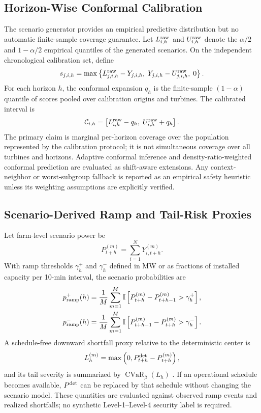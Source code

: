 \documentclass[journal]{IEEEtran}
\newcommand{\1}{\mathbb{I}}
\begin{document}
\subsection{Horizon-Wise Conformal Calibration}
The scenario generator provides an empirical predictive distribution but no automatic finite-sample coverage guarantee. Let $L^{\rm raw}_{i,h}$ and $U^{\rm raw}_{i,h}$ denote the $\alpha/2$ and $1-\alpha/2$ empirical quantiles of the generated scenarios. On the independent chronological calibration set, define
\begin{equation}
s_{j,i,h}=\max\left\{L^{\rm raw}_{j,i,h}-Y_{j,i,h},\;Y_{j,i,h}-U^{\rm raw}_{j,i,h},\;0\right\}.
\end{equation}
For each horizon $h$, the conformal expansion $q_h$ is the finite-sample $(1-\alpha)$ quantile of scores pooled over calibration origins and turbines. The calibrated interval is
\begin{equation}
\mathcal C_{i,h}=\left[L^{\rm raw}_{i,h}-q_h,\;U^{\rm raw}_{i,h}+q_h\right].
\label{eq:conformal}
\end{equation}
The primary claim is marginal per-horizon coverage over the population represented by the calibration protocol; it is not simultaneous coverage over all turbines and horizons. Adaptive conformal inference \cite{gibbs2021aci} and density-ratio-weighted conformal prediction \cite{tibshirani2019covshift} are evaluated as shift-aware extensions. Any context-neighbor or worst-subgroup fallback is reported as an empirical safety heuristic unless its weighting assumptions are explicitly verified.

\subsection{Scenario-Derived Ramp and Tail-Risk Proxies}
Let farm-level scenario power be
\begin{equation}
P_{t+h}^{(m)}=\sum_{i=1}^{N}Y_{i,t+h}^{(m)}.
\end{equation}
With ramp thresholds $\gamma_h^+$ and $\gamma_h^-$ defined in MW or as fractions of installed capacity per 10-min interval, the scenario probabilities are
\begin{align}
p_{\rm ramp}^{+}(h)&=\frac{1}{M}\sum_{m=1}^{M}\1\left[P_{t+h}^{(m)}-P_{t+h-1}^{(m)}>\gamma_h^+\right],\\
p_{\rm ramp}^{-}(h)&=\frac{1}{M}\sum_{m=1}^{M}\1\left[P_{t+h-1}^{(m)}-P_{t+h}^{(m)}>\gamma_h^-\right].
\end{align}
A schedule-free downward shortfall proxy relative to the deterministic center is
\begin{equation}
L_h^{(m)}=\max\left(0,P_{t+h}^{\rm det}-P_{t+h}^{(m)}\right),
\end{equation}
and its tail severity is summarized by $\operatorname{CVaR}_\beta(L_h)$ \cite{rockafellar2002cvar}. If an operational schedule becomes available, $P^{\rm det}$ can be replaced by that schedule without changing the scenario model. These quantities are evaluated against observed ramp events and realized shortfalls; no synthetic Level-1--Level-4 security label is required.
\end{document}
